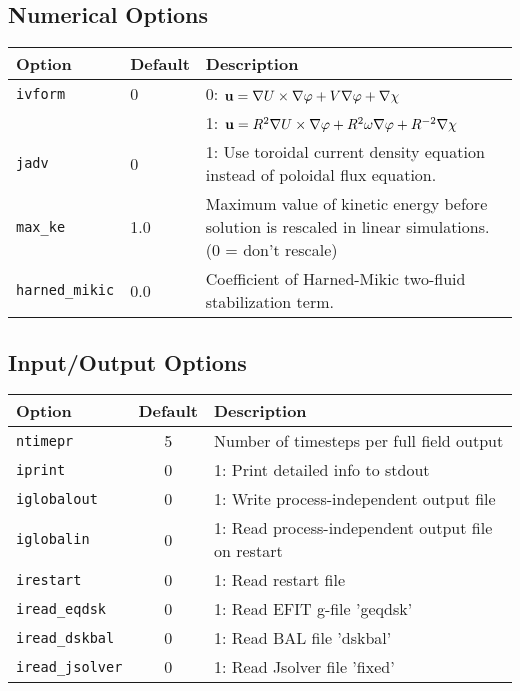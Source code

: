 \subsection{Numerical Options}
\begin{tabular}{llp{3in}}
  \textbf{Option}&\textbf{Default}&\textbf{Description}\\
  \hline
  \texttt{ivform} & 0   & 0: $\mathbf{u} = \nabla U\times\nabla \varphi + V
   \nabla \varphi + \nabla \chi$\\
   & & 1: $\mathbf{u} = R^2 \nabla U\times\nabla \varphi + R^2 \omega
   \nabla \varphi + R^{-2} \nabla \chi$\\
  \texttt{jadv}   & 0   & 1: Use toroidal current density equation
                          instead of poloidal flux equation.\\
  \texttt{max\_ke}& 1.0  & Maximum value of kinetic energy before solution is
                          rescaled in linear simulations. (0 = don't rescale)\\
  \texttt{harned\_mikic} & 0.0 & Coefficient of Harned-Mikic two-fluid
                          stabilization term.\\
\end{tabular}

\subsection{Input/Output Options}

\begin{tabular}{lcp{2.7in}}
  \textbf{Option}&\textbf{Default}&\textbf{Description}\\
  \hline
  \texttt{ntimepr}   & 5 & Number of timesteps per full field output\\
  \texttt{iprint}    & 0 & 1: Print detailed info to stdout\\
  \texttt{iglobalout}& 0 & 1: Write process-independent output file\\
  \texttt{iglobalin} & 0 & 1: Read process-independent output file on restart\\
  \texttt{irestart}  & 0 & 1: Read restart file\\
  \texttt{iread\_eqdsk}   & 0 & 1: Read EFIT g-file 'geqdsk'\\
  \texttt{iread\_dskbal}  & 0 & 1: Read BAL file 'dskbal'\\
  \texttt{iread\_jsolver} & 0 & 1: Read Jsolver file 'fixed'
\end{tabular}



